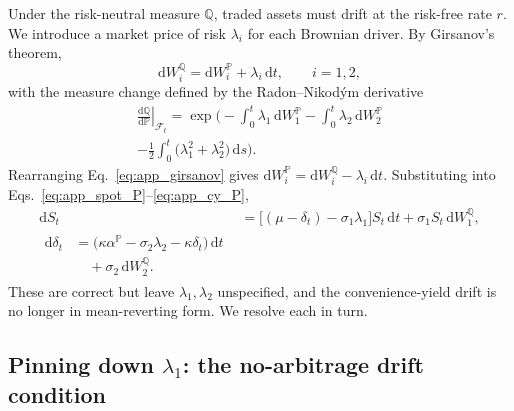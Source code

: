 \documentclass[sigconf, authorversion=true, nonacm=true]{acmart}
\newcommand{\convyield}{\delta}             %
\newcommand{\meanrev}{\kappa}               %
\newcommand{\longrun}{\alpha}               %
\begin{document}
Under the risk-neutral measure $\mathbb{Q}$, traded assets must drift at the risk-free rate $r$. We introduce a market price of risk $\lambda_i$ for each Brownian driver. By Girsanov's theorem,
\begin{equation}
  \label{eq:app_girsanov}
  \mathrm{d}W_i^{\mathbb{Q}} = \mathrm{d}W_i^{\mathbb{P}} + \lambda_i\,\mathrm{d}t, \qquad i = 1, 2,
\end{equation}
\noindent
with the measure change defined by the Radon--Nikod\'ym derivative
\begin{equation}
  \label{eq:app_rn}
  \begin{multlined}
  \left.\frac{\mathrm{d}\mathbb{Q}}{\mathrm{d}\mathbb{P}}\right|_{\mathcal{F}_t}
  = \exp\!\Bigg(
    -\int_0^t \lambda_1\,\mathrm{d}W_1^{\mathbb{P}}
    -\int_0^t \lambda_2\,\mathrm{d}W_2^{\mathbb{P}} \\
    -\frac{1}{2}\int_0^t \big(\lambda_1^2 + \lambda_2^2\big)\,\mathrm{d}s
  \Bigg).
  \end{multlined}
\end{equation}
\noindent
Rearranging Eq.~\ref{eq:app_girsanov} gives $\mathrm{d}W_i^{\mathbb{P}} = \mathrm{d}W_i^{\mathbb{Q}} - \lambda_i\,\mathrm{d}t$. Substituting into Eqs.~\ref{eq:app_spot_P}--\ref{eq:app_cy_P},
\begin{align}
  \label{eq:app_spot_sub}
  \mathrm{d}S_t &= \big[(\mu - \convyield_t) - \sigma_1\lambda_1\big] S_t\,\mathrm{d}t + \sigma_1 S_t\,\mathrm{d}W_1^{\mathbb{Q}}, \\
  \label{eq:app_cy_sub}
  \begin{split}
  \mathrm{d}\convyield_t &= \big(\meanrev\longrun^{\mathbb{P}} - \sigma_2\lambda_2 - \meanrev\convyield_t\big)\,\mathrm{d}t \\
    &\quad + \sigma_2\,\mathrm{d}W_2^{\mathbb{Q}}.
  \end{split}
\end{align}
\noindent
These are correct but leave $\lambda_1, \lambda_2$ unspecified, and the convenience-yield drift is no longer in mean-reverting form. We resolve each in turn.

\subsection{Pinning down \texorpdfstring{$\lambda_1$}{lambda1}: the no-arbitrage drift condition}
\end{document}
